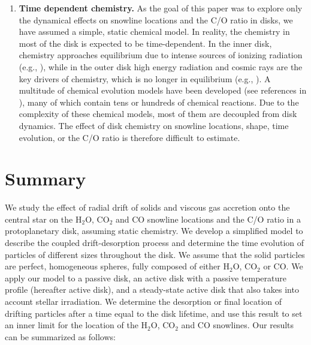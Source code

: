\documentclass[apj]{emulateapj}
\newcommand{\emgr}[1]{\emph{ \color{gray} #1}}
\begin{document}
\begin{enumerate}
\item \textbf{Time dependent chemistry.} As the goal of this paper was to explore only the dynamical effects on snowline locations and the C/O ratio in disks, we have assumed a simple, static chemical model. In reality, the chemistry in most of the disk is expected to be time-dependent.%
In the inner disk, chemistry approaches equilibrium due to intense sources of ionizing radiation (e.g., \citealt{ilgner04}), while in the outer disk high energy radiation and cosmic rays are the key drivers of chemistry, which is no longer in equilibrium (e.g., \citealt{vandishoeck06}). A multitude of chemical evolution models have been developed (see references in \citealt{henning13}), many of which contain tens or hundreds of chemical reactions. Due to the complexity of these chemical models, most of them are decoupled from disk dynamics. The effect of disk chemistry on snowline locations, shape, time evolution, or the C/O ratio is therefore difficult to estimate.  %


\end{enumerate}




\section{Summary}
\label{sec:summary}

We study the effect of radial drift of solids and viscous gas accretion onto the central star on the H$_2$O, CO$_2$ and CO snowline locations and the C/O ratio in a protoplanetary disk, assuming static chemistry. We develop a simplified model to describe the coupled drift-desorption process and determine the time evolution of particles of different sizes throughout the disk. We assume that the solid particles are perfect, homogeneous spheres, fully composed of either H$_2$O, CO$_2$ or CO. We apply our model to a passive disk, an active disk with a passive temperature profile (hereafter active disk), and a steady-state active disk that also takes into account stellar irradiation. We determine the desorption or final location of drifting particles after a time equal to the disk lifetime, and use this result to set an inner limit for the location of the H$_2$O, CO$_2$ and CO snowlines. Our results can be summarized as follows:
\end{document}
